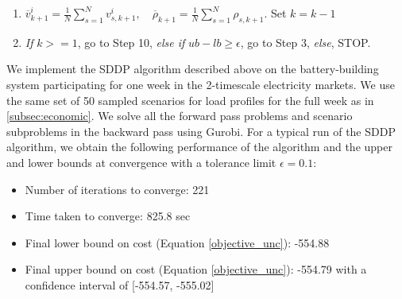 \documentclass[11pt,twoside]{article}
\begin{document}
{\begin{enumerate}
\begin{enumerate}
\item Add a cut to the optimization problems $\mathcal{P}^f_{k}$ and $\mathcal{P}^b_{k}$: $\theta_{k+1} \geq \overline{v}^i_{k+1} - \overline{\rho}_{k+1}E_{n_\text{rtm}, k}$
\item Solve the problem $\mathcal{P}^b_{k}$. Get the optimal objective value $Q^{i+1}_{s,k+1}(E_{0, k})$ and the duals corresponding to each of the ${n_\text{rtm}}$ constraints linking the state variables at each subinterval. Denote the sum of these duals by $\rho_{s,k+1}$ and calculate $v^i_{s,k+1} = Q^{i+1}_{s,k+1}(E_{0, k}) - \rho_{s,k+1} E_{n_\text{rtm},k-1}$
\end{enumerate}
\emph{end for}
\item $\overline{v}^i_{k+1} = \frac{1}{N}\sum\limits_{s=1}^{N}{v^i_{s,k+1}}, \quad \overline{\rho}_{k+1} = \frac{1}{N}\sum\limits_{s=1}^{N}{\rho_{s,k+1}}$. Set $k=k-1$
\item \emph{If} $k >= 1$, go to Step 10, \emph{else if} $ub - lb \geq \epsilon$, go to Step 3, \emph{else}, STOP.
\end{enumerate}}

We implement the SDDP algorithm described above on the battery-building system participating for one week in the 2-timescale electricity markets. We use the same set of 50 sampled scenarios for load profiles for the full week as in \ref{subsec:economic}. We solve all the forward pass problems and scenario subproblems in the backward pass using Gurobi. For a typical run of the SDDP algorithm, we obtain the following performance of the algorithm and the upper and lower bounds at convergence with a tolerance limit $\epsilon = 0.1$:
\begin{itemize}
\item Number of iterations to converge: 221
\item Time taken to converge: 825.8 sec
\item Final lower bound on cost (Equation \ref{objective_unc}): -554.88
\item Final upper bound on cost (Equation \ref{objective_unc}): -554.79 with a confidence interval of [-554.57, -555.02]
\end{itemize}
\end{document}
